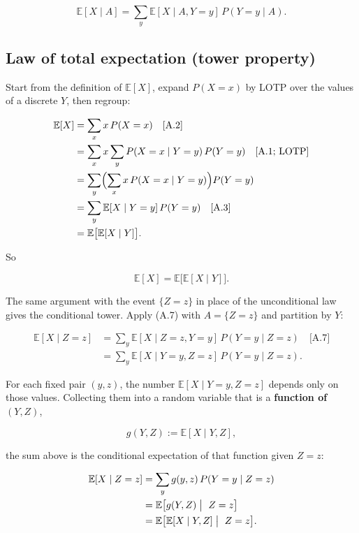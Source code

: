 \begin{equation}
\mathbb{E}[X\mid A]
=
\sum_y \mathbb{E}[X\mid A,Y=y]\, P(Y=y\mid A).
\tag{A.7}
\end{equation}

\subsection{Law of total expectation (tower property)}

Start from the definition of $\mathbb{E}[X]$, expand $P(X=x)$ by LOTP over the values of a discrete $Y$, then regroup:

\[
\begin{aligned}
\mathbb{E}[X]
&=
\sum_x x\, P(X=x)
\quad\text{[A.2]}
\\
&=
\sum_x x
\sum_y P(X=x\mid Y=y)\, P(Y=y)
\quad\text{[A.1; LOTP]}
\\
&=
\sum_y
\Bigl(
\sum_x x\, P(X=x\mid Y=y)
\Bigr)
P(Y=y)
\\
&=
\sum_y \mathbb{E}[X\mid Y=y]\, P(Y=y)
\quad\text{[A.3]}
\\
&=
\mathbb{E}\bigl[\mathbb{E}[X\mid Y]\bigr].
\end{aligned}
\]

So

\begin{equation}
\mathbb{E}[X]
=
\mathbb{E}\bigl[\mathbb{E}[X\mid Y]\bigr].
\tag{A.8}
\end{equation}

The same argument with the event $\{Z=z\}$ in place of the unconditional law gives the conditional tower. Apply (A.7) with $A=\{Z=z\}$ and partition by $Y$:

\[
\begin{aligned}
\mathbb{E}[X\mid Z=z]
&=
\sum_y \mathbb{E}[X\mid Z=z,Y=y]\, P(Y=y\mid Z=z)
\quad\text{[A.7]}
\\
&=
\sum_y \mathbb{E}[X\mid Y=y,Z=z]\, P(Y=y\mid Z=z).
\end{aligned}
\]

For each fixed pair $(y,z)$, the number $\mathbb{E}[X\mid Y=y,Z=z]$ depends only on those values. Collecting them into a random variable that is a \textbf{function of $(Y,Z)$},

\[
g(Y,Z)
:=
\mathbb{E}[X\mid Y,Z],
\]

the sum above is the conditional expectation of that function given $Z=z$:

\[
\begin{aligned}
\mathbb{E}[X\mid Z=z]
&=
\sum_y g(y,z)\, P(Y=y\mid Z=z)
\\
&=
\mathbb{E}\bigl[g(Y,Z)\bigm|\ Z=z\bigr]
\\
&=
\mathbb{E}\bigl[\mathbb{E}[X\mid Y,Z]\bigm|\ Z=z\bigr].
\end{aligned}
\]

